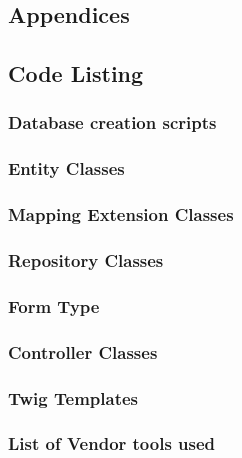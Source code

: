 \documentclass[a4paper,12pt]{article}
\begin{document}
\begin{samepage}

\section {Appendices}
\subsection {Code Listing}

\subsubsection {Database creation scripts}
\subsubsection {Entity Classes}
\subsubsection {Mapping Extension Classes}
\subsubsection {Repository Classes}
\subsubsection {Form Type}
\subsubsection {Controller Classes}
\subsubsection {Twig Templates}
\subsubsection {List of Vendor tools used}
\end{samepage}
\newpage\printbibliography[title={Bibliography}]
\end{document}
